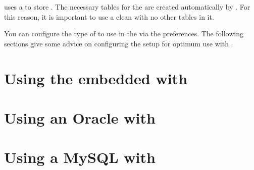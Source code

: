 \app{} uses a \gddb{} to store \gdprojects{}. The necessary tables for the \gddb{} are created automatically by \app{}. For this reason, it is important to use a clean \gddb{} with no other tables in it.

You can configure the type of \gddb{} to use in the \ite{} via the preferences. The following sections give some advice on configuring the \gddb{} setup for optimum use with \app{}.

\section{Using the embedded \gddb{} with \app{}}


\section{Using an Oracle \gddb{} with \app{}}


\section{Using a MySQL \gddb{} with \app{}}


